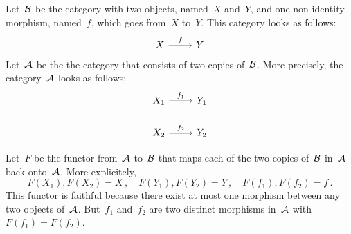 \subsection{}

Let~$\mathcal{B}$ be the category with two objects, named~$X$ and~$Y$, and one non-identity morphism, named~$f$, which goes from~$X$ to~$Y$.
This category looks as follows:
\[
	\begin{tikzcd}
		X
		\arrow{r}[above]{f}
		&
		Y
	\end{tikzcd}
\]
Let~$\mathcal{A}$ be the the category that consists of two copies of~$\mathcal{B}$.
More precisely, the category~$\mathcal{A}$ looks as follows:
\[
	\begin{tikzcd}
		X_1
		\arrow{r}[above]{f_1}
		&
		Y_1
		\\
		X_2
		\arrow{r}[above]{f_2}
		&
		Y_2
	\end{tikzcd}
\]

Let~$F$ be the functor from~$\mathcal{A}$ to~$\mathcal{B}$ that maps each of the two copies of~$\mathcal{B}$ in~$\mathcal{A}$ back onto~$\mathcal{A}$.
More explicitely,
\[
	F(X_1), F(X_2) = X \,,
	\quad
	F(Y_1), F(Y_2) = Y \,,
	\quad
	F(f_1), F(f_2) = f \,.
\]
This functor is faithful because there exist at most one morphism between any two objects of~$\mathcal{A}$.
But~$f_1$ and~$f_2$ are two distinct morphisms in~$\mathcal{A}$ with~$F(f_1) = F(f_2)$.
